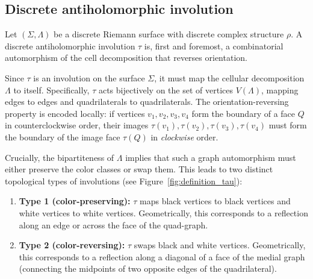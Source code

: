 \documentclass[11pt,a4paper]{article}
\theoremstyle{definition}
\begin{document}
\subsection{Discrete antiholomorphic involution}\label{sec:discrete_involution}

Let $(\Sigma, \Lambda)$ be a discrete Riemann surface with discrete complex structure $\rho$. A discrete antiholomorphic involution $\tau$ is, first and foremost, a combinatorial automorphism of the cell decomposition that reverses orientation.

Since $\tau$ is an involution on the surface $\Sigma$, it must map the cellular decomposition $\Lambda$ to itself. Specifically, $\tau$ acts bijectively on the set of vertices $V(\Lambda)$, mapping edges to edges and quadrilaterals to quadrilaterals.
The orientation-reversing property is encoded locally: if vertices $v_1, v_2, v_3, v_4$ form the boundary of a face $Q$ in counterclockwise order, their images $\tau(v_1), \tau(v_2), \tau(v_3), \tau(v_4)$ must form the boundary of the image face $\tau(Q)$ in \emph{clockwise} order.

Crucially, the bipartiteness of $\Lambda$ implies that such a graph automorphism must either preserve the color classes or swap them. This leads to two distinct topological types of involutions (see Figure~\ref{fig:definition_tau}):
\begin{enumerate}
	\item \textbf{Type 1 (color-preserving):} $\tau$ maps black vertices to black vertices and white vertices to white vertices. Geometrically, this corresponds to a reflection along an edge or across the face of the quad-graph.
	\item \textbf{Type 2 (color-reversing):} $\tau$ swaps black and white vertices. Geometrically, this corresponds to a reflection along a diagonal of a face of the medial graph (connecting the midpoints of two opposite edges of the quadrilateral).
\end{enumerate}
\end{document}
